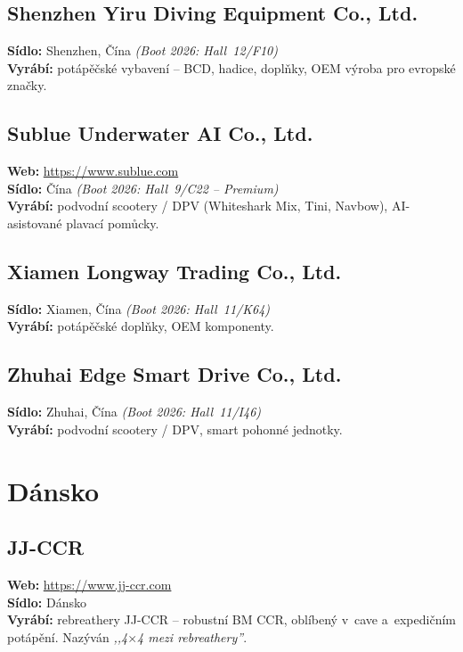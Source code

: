 \documentclass[11pt,a4paper]{article}
\begin{document}
\subsection{Shenzhen Yiru Diving Equipment Co., Ltd.}
\textbf{Sídlo:} Shenzhen, Čína \quad\emph{(Boot 2026: Hall~12/F10)} \\
\textbf{Vyrábí:} potápěčské vybavení -- BCD, hadice, doplňky, OEM výroba pro evropské značky.

\subsection{Sublue Underwater AI Co., Ltd.}
\textbf{Web:} \url{https://www.sublue.com} \\
\textbf{Sídlo:} Čína \quad\emph{(Boot 2026: Hall~9/C22 -- Premium)} \\
\textbf{Vyrábí:} podvodní scootery / DPV (Whiteshark Mix, Tini, Navbow), AI-asistované plavací pomůcky.

\subsection{Xiamen Longway Trading Co., Ltd.}
\textbf{Sídlo:} Xiamen, Čína \quad\emph{(Boot 2026: Hall~11/K64)} \\
\textbf{Vyrábí:} potápěčské doplňky, OEM komponenty.

\subsection{Zhuhai Edge Smart Drive Co., Ltd.}
\textbf{Sídlo:} Zhuhai, Čína \quad\emph{(Boot 2026: Hall~11/I46)} \\
\textbf{Vyrábí:} podvodní scootery / DPV, smart pohonné jednotky.

\section{Dánsko}

\subsection{JJ-CCR}
\textbf{Web:} \url{https://www.jj-ccr.com} \\
\textbf{Sídlo:} Dánsko \\
\textbf{Vyrábí:} rebreathery JJ-CCR -- robustní BM CCR, oblíbený v~cave a~expedičním potápění. Nazýván \emph{,,4$\times$4 mezi rebreathery''}.
\end{document}
